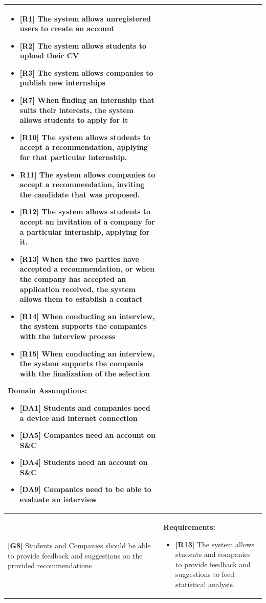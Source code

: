 \begin{longtable}{|p{}|p{}|}
\begin{itemize}
    \item \textbf{[R1]} The system allows unregistered users to create an account
    \item \textbf{[R2]} The system allows students to upload their CV
    \item \textbf{[R3]} The system allows companies to publish new internships
    \item \textbf{[R7]} When finding an internship that suits their interests, the system allows students to apply for it
    \item  \textbf{[R10]} The system allows students to accept a recommendation, applying for that particular internship.
    \item  \textbf{R11]} The system allows companies to accept a recommendation, inviting the candidate that was proposed.
    \item \textbf{[R12]} The system allows students to accept an invitation of a company for a particular internship, applying for it.
    \item \textbf{[R13]} When the two parties have accepted a recommendation, or when the company has accepted an application received, the system allows them to establish a contact
    \item \textbf{[R14]} When conducting an interview, the system supports the companies with the interview process 
    \item \textbf{[R15]} When conducting an interview, the system supports the companis with the finalization of the selection
\end{itemize}
\textbf{Domain Assumptions:}
\begin{itemize}
    \item \textbf{[DA1]} Students and companies need a device and internet connection
    \item \textbf{[DA5]} Companies need an account on S\&C
    \item \textbf{[DA4]} Students need an account on S\&C
    \item \textbf{[DA9]} Companies need to be able to evaluate an interview
\end{itemize} \\
\hline
\textbf{[G8]} Students and Companies should be able to provide feedback and suggestions on the provided recommendations
& 
\textbf{Requirements:}
\begin{itemize}
    \item \textbf{[R13]} The system allows students and companies to provide feedback and suggestions to feed statistical analysis.

\end{itemize}
\end{longtable}
